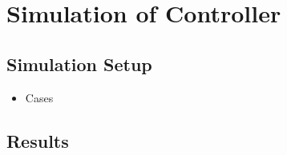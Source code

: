 \section{Simulation of Controller}

\subsection{Simulation Setup}

\begin{itemize}
	\item Cases
\end{itemize}


\subsection{Results}